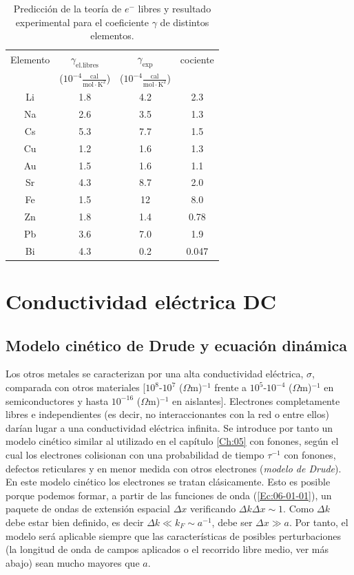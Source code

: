 \begin{table}[h!] \centering
	\begin{tabular}{cccc} 
		Elemento & $\gamma_{\text{el.libres}}$ &  $\gamma_{\text{exp}}$ & cociente \\
 		& ($10^{-4} \frac{\text{cal}}{\text{mol}\cdot\text{K}^2}$) & ($10^{-4} \frac{\text{cal}}{\text{mol}\cdot\text{K}^2}$)  &  \\ \hline
 		Li & 1.8 & 4.2 & 2.3 \\
 		Na & 2.6 & 3.5 & 1.3 \\
 		Cs & 5.3 & 7.7 & 1.5 \\
 		Cu & 1.2 & 1.6 & 1.3 \\
 		Au & 1.5 & 1.6 & 1.1 \\
 		Sr & 4.3 & 8.7 & 2.0 \\
 		Fe & 1.5 & 12 & 8.0 \\
 		Zn & 1.8 & 1.4 & 0.78 \\
 		Pb & 3.6 & 7.0 & 1.9 \\
 		Bi & 4.3 & 0.2 & 0.047 
	\end{tabular}	
	\caption{Predicción de la teoría de $e^-$ libres y resultado experimental para el coeficiente $\gamma$ de distintos elementos.}
	\label{Tab:06-01}
\end{table}

\section{Conductividad eléctrica DC}
\subsection{Modelo cinético de Drude y ecuación dinámica}

Los otros metales se caracterizan por una alta conductividad eléctrica, $\sigma$, comparada con otros materiales [$10^8$-$10^7$ ($\Omega$m)$^{-1}$ frente a $10^5$-$10^{-4}$ ($\Omega$m)$^{-1}$ en semiconductores y hasta $10^{-16}$ ($\Omega$m)$^{-1}$ en aislantes]. Electrones completamente libres e independientes (es decir, no interaccionantes con la red o entre ellos) darían lugar a una conductividad eléctrica infinita. Se introduce por tanto un modelo cinético similar al utilizado en el capítulo \ref{Ch:05} con fonones, según el cual los electrones colisionan con una probabilidad de tiempo $\tau^{-1}$ con fonones, defectos reticulares y en menor medida con otros electrones (\textit{modelo de Drude}). En este modelo cinético los electrones se tratan clásicamente. Esto es posible porque podemos formar, a partir de las funciones de onda (\ref{Ec:06-01-01}), un paquete de ondas de extensión espacial $\Delta x$ verificando $\Delta k \Delta x \sim 1$. Como $\Delta k$ debe estar bien definido, es decir $\Delta k \ll k_F \sim a^{-1}$, debe ser $\Delta x \gg a$. Por tanto, el modelo será aplicable siempre que las características de posibles perturbaciones (la longitud de onda de campos aplicados o el recorrido libre medio, ver más abajo) sean mucho mayores que $a$. 

